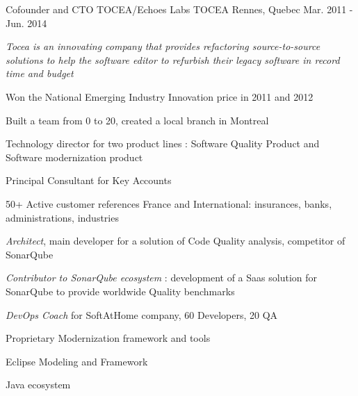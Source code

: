 \begin{cventries}
    \cventry
    {Cofounder and CTO TOCEA/Echoes Labs} %
    {TOCEA} %
    {Rennes, Quebec} %
    {Mar. 2011 - Jun. 2014} %
    {
        \experience
            {
                \begin{cvitems} %
                    \item{\emph{Tocea is an innovating company that provides refactoring source-to-source solutions to help the software editor to refurbish their legacy software in record time and budget}}
                    \item{Won the National Emerging Industry Innovation price in 2011 and 2012}
                    \item{Built a team from 0 to 20, created a local branch in Montreal}
                    \item{Technology director for two product lines : Software Quality Product and Software modernization product}
                    \item{Principal Consultant for Key Accounts}
                    \item{50+ Active customer references France and International: insurances, banks, administrations, industries}
                \end{cvitems}
            }
            {
               \begin{cvitems} %
                \item {\emph{Architect}, main developer for a solution of Code Quality analysis, competitor of SonarQube }
                \item {\emph{Contributor to SonarQube ecosystem} : development of a Saas solution for SonarQube to provide worldwide Quality benchmarks}
                \item{\emph{DevOps Coach} for SoftAtHome company, 60 Developers, 20 QA}
               \end{cvitems}
            }
            {
                \begin{cvitems} %
                    \item{Proprietary Modernization framework and tools}
                    \item{Eclipse Modeling and Framework}
                    \item{Java ecosystem}
                \end{cvitems}
            }            
    }


\end{cventries}
